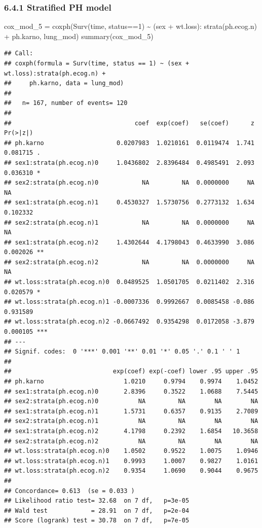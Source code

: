 \documentclass[
]{article}
\newenvironment{Shaded}{\begin{snugshade}}{\end{snugshade}}
\newcommand{\DecValTok}[1]{\textcolor[rgb]{0.00,0.00,0.81}{#1}}
\newcommand{\FunctionTok}[1]{\textcolor[rgb]{0.00,0.00,0.00}{#1}}
\newcommand{\NormalTok}[1]{#1}
\newcommand{\OtherTok}[1]{\textcolor[rgb]{0.56,0.35,0.01}{#1}}
\newcommand{\SpecialCharTok}[1]{\textcolor[rgb]{0.00,0.00,0.00}{#1}}
\begin{document}
\hypertarget{stratified-ph-model}{%
\subsubsection{6.4.1 Stratified PH model}\label{stratified-ph-model}}

\begin{Shaded}
\begin{Highlighting}[]
\NormalTok{cox\_mod\_5 }\OtherTok{=} \FunctionTok{coxph}\NormalTok{(}\FunctionTok{Surv}\NormalTok{(time, status}\SpecialCharTok{==}\DecValTok{1}\NormalTok{) }\SpecialCharTok{\textasciitilde{}}\NormalTok{ (sex }\SpecialCharTok{+}\NormalTok{ wt.loss)}\SpecialCharTok{:} \FunctionTok{strata}\NormalTok{(ph.ecog.n) }\SpecialCharTok{+}\NormalTok{ ph.karno, lung\_mod) }
\FunctionTok{summary}\NormalTok{(cox\_mod\_5)}
\end{Highlighting}
\end{Shaded}

\begin{verbatim}
## Call:
## coxph(formula = Surv(time, status == 1) ~ (sex + wt.loss):strata(ph.ecog.n) + 
##     ph.karno, data = lung_mod)
## 
##   n= 167, number of events= 120 
## 
##                                  coef  exp(coef)   se(coef)      z Pr(>|z|)    
## ph.karno                    0.0207983  1.0210161  0.0119474  1.741 0.081715 .  
## sex1:strata(ph.ecog.n)0     1.0436802  2.8396484  0.4985491  2.093 0.036310 *  
## sex2:strata(ph.ecog.n)0            NA         NA  0.0000000     NA       NA    
## sex1:strata(ph.ecog.n)1     0.4530327  1.5730756  0.2773132  1.634 0.102332    
## sex2:strata(ph.ecog.n)1            NA         NA  0.0000000     NA       NA    
## sex1:strata(ph.ecog.n)2     1.4302644  4.1798043  0.4633990  3.086 0.002026 ** 
## sex2:strata(ph.ecog.n)2            NA         NA  0.0000000     NA       NA    
## wt.loss:strata(ph.ecog.n)0  0.0489525  1.0501705  0.0211402  2.316 0.020579 *  
## wt.loss:strata(ph.ecog.n)1 -0.0007336  0.9992667  0.0085458 -0.086 0.931589    
## wt.loss:strata(ph.ecog.n)2 -0.0667492  0.9354298  0.0172058 -3.879 0.000105 ***
## ---
## Signif. codes:  0 '***' 0.001 '**' 0.01 '*' 0.05 '.' 0.1 ' ' 1
## 
##                            exp(coef) exp(-coef) lower .95 upper .95
## ph.karno                      1.0210     0.9794    0.9974    1.0452
## sex1:strata(ph.ecog.n)0       2.8396     0.3522    1.0688    7.5445
## sex2:strata(ph.ecog.n)0           NA         NA        NA        NA
## sex1:strata(ph.ecog.n)1       1.5731     0.6357    0.9135    2.7089
## sex2:strata(ph.ecog.n)1           NA         NA        NA        NA
## sex1:strata(ph.ecog.n)2       4.1798     0.2392    1.6854   10.3658
## sex2:strata(ph.ecog.n)2           NA         NA        NA        NA
## wt.loss:strata(ph.ecog.n)0    1.0502     0.9522    1.0075    1.0946
## wt.loss:strata(ph.ecog.n)1    0.9993     1.0007    0.9827    1.0161
## wt.loss:strata(ph.ecog.n)2    0.9354     1.0690    0.9044    0.9675
## 
## Concordance= 0.613  (se = 0.033 )
## Likelihood ratio test= 32.68  on 7 df,   p=3e-05
## Wald test            = 28.91  on 7 df,   p=2e-04
## Score (logrank) test = 30.78  on 7 df,   p=7e-05
\end{verbatim}
\end{document}
